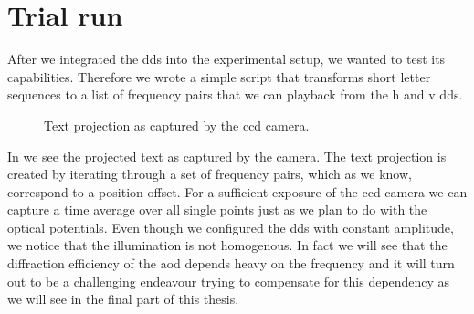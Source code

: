 \section{Trial run}

After we integrated the \gls{dds} into the experimental setup, we wanted to
test its capabilities. Therefore we wrote a simple script that transforms
short letter sequences to a list of frequency pairs that we can playback
from the \gls{h} and \gls{v} \gls{dds}.
\begin{figure}[htb]
  \centering
  \begin{adjustbox}{width=\textwidth}
  \end{adjustbox}
  \caption{Text projection as captured by the \gls{ccd} camera.
  }\label{fig:setup_projection}
\end{figure}
In  we see the projected text as captured by the
camera. The text projection is created by iterating through a set of frequency
pairs, which as we know, correspond to a position offset. For a sufficient
exposure of the \gls{ccd} camera we can capture a time average over all
single points just as we plan to do with the optical potentials. Even though
we configured the \gls{dds} with constant amplitude, we notice that the
illumination is not homogenous. In fact we will see that the diffraction
efficiency of the \gls{aod} depends heavy on the frequency and it will
turn out to be a challenging endeavour trying to compensate for this
dependency as we will see in the final part of this thesis.
